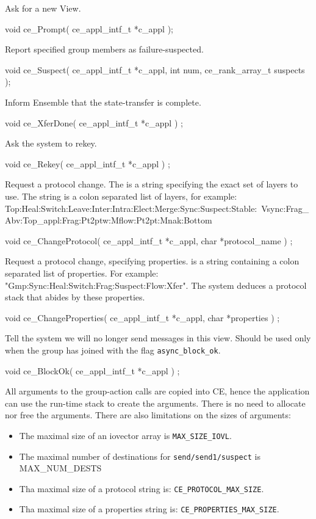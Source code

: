 Ask for a new View.
\begin{codebox}
void ce_Prompt(
    ce_appl_intf_t *c_appl
);
\end{codebox}

 Report specified group members as failure-suspected.
\begin{codebox}
void ce_Suspect(
    ce_appl_intf_t *c_appl,
    int num,
    ce_rank_array_t suspects
);
\end{codebox}
	
Inform Ensemble that the state-transfer is complete. 
\begin{codebox}
void ce_XferDone(
    ce_appl_intf_t *c_appl
) ;
\end{codebox}

Ask the system to rekey.
\begin{codebox}
void ce_Rekey(
    ce_appl_intf_t *c_appl
) ;
\end{codebox}

Request a protocol change.  The  is a string
specifying the exact set of layers to use. The string is a colon
separated list of layers, for example:
Top:Heal:Switch:Leave:Inter:Intra:Elect:Merge:Sync:Suspect:Stable:\
Vsync:Frag\_Abv:Top\_appl:Frag:Pt2ptw:Mflow:Pt2pt:Mnak:Bottom
\begin{codebox}
void ce_ChangeProtocol(
    ce_appl_intf_t *c_appl,
    char *protocol_name
) ;
\end{codebox}


Request a protocol change, specifying properties.
 is a string containing a colon separated list of
properties. For example:
"Gmp:Sync:Heal:Switch:Frag:Suspect:Flow:Xfer".
The system deduces a protocol stack that abides by these properties.
\begin{codebox}
void ce_ChangeProperties(
    ce_appl_intf_t *c_appl,
    char *properties
) ;
\end{codebox}

Tell the system we will no longer send messages in this view. Should
be used only when the group has joined with the flag {\tt async\_block\_ok}.
\begin{codebox}
void ce_BlockOk(
    ce_appl_intf_t *c_appl
) ;
\end{codebox}


All arguments to the group-action calls are copied into CE, hence the
application can use the run-time stack to create the arguments. There
is no need to allocate nor free the arguments. There are also
limitations on the sizes of arguments: 
\begin{itemize}
\item The maximal size of an iovector array is {\tt MAX\_SIZE\_IOVL}.
\item The maximal number of destinations for {\tt send/send1/suspect}
  is MAX\_NUM\_DESTS
\item Tha maximal size of a protocol string is: {\tt CE\_PROTOCOL\_MAX\_SIZE}.
\item Tha maximal size of a properties string is: {\tt CE\_PROPERTIES\_MAX\_SIZE}.
\end{itemize}

